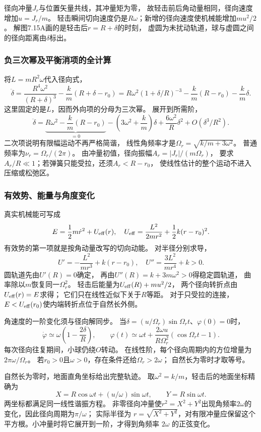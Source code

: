 \documentclass[UTF8,fontset=fandol,a4paper,11pt]{ctexart}
\begin{document}
径向冲量$J_r$与位置矢量共线，其冲量矩为零，
故轻击前后角动量相同，径向速度增加$u=J_r/m$。
轻击瞬间切向速度仍是$R\omega$；新增的径向速度使机械能增加$mu^2/2$。
解图7.15A画的是轻击后$r=R+\delta$的时刻，
虚圆为未扰动轨道，球与虚圆之间的径向距离由$\delta$标出。

\subsubsection*{负三次幂及平衡消项的全计算}
将$L=mR^2\omega$代入径向式，
\[
\ddot\delta=\frac{R^4\omega^2}{(R+\delta)^3}
-\frac{k}{m}(R+\delta-r_0)
=R\omega^2(1+\delta/R)^{-3}
-\frac{k}{m}(R-r_0)-\frac{k}{m}\delta.
\]
这里固定的是$L$，因而外向项的分母为三次幂。
展开到所需阶，
\[
\ddot\delta=
\underbrace{R\omega^2-\frac{k}{m}(R-r_0)}_{=0}
-\left(3\omega^2+\frac{k}{m}\right)\delta
+\frac{6\omega^2}{R}\delta^2+O(\delta^3/R^2).
\]
二次项说明有限幅运动不再严格简谐，
线性角频率才是$\Omega_r=\sqrt{k/m+3\omega^2}$。
普通频率为$\nu_r=\Omega_r/(2\pi)$。
由冲量初值，径向振幅$A_r=|J_r|/(m\Omega_r)$，
要求$A_r/R\ll1$；若弹簧只能受拉，还须$A_r<R-r_0$，
使线性估计的整个运动不进入压缩或松弛区。

\subsubsection*{有效势、能量与角度变化}
真实机械能可写成
\[
E=\frac12m\dot r^2+U_{\rm eff}(r),\quad
U_{\rm eff}=\frac{L^2}{2mr^2}+\frac12k(r-r_0)^2.
\]
有效势的第一项就是按角动量改写的切向动能。
对半径分别求导，
\[
U'=-\frac{L^2}{mr^3}+k(r-r_0),\quad
U''=\frac{3L^2}{mr^4}+k>0.
\]
圆轨道先由$U'(R)=0$确定，
再由$U''(R)=k+3m\omega^2>0$得稳定圆轨道，
曲率除以$m$恢复同一$\Omega_r^2$。
轻击后能量为$U_{\rm eff}(R)+mu^2/2$，
两个径向转折点由$U_{\rm eff}(r)=E$求得；
它们只在线性近似下关于$R$等距。
对于只受拉的连接，$E<U_{\rm eff}(r_0)$使内端转折点位于自然长外侧。

角速度的一阶变化须与径向解同步。
当$\delta=(u/\Omega_r)\sin\Omega_rt$、$\varphi(0)=0$时，
\[
\dot\varphi\simeq\omega\left(1-\frac{2\delta}{R}\right),\qquad
\varphi(t)\simeq\omega t+
\frac{2\omega u}{R\Omega_r^2}(\cos\Omega_rt-1).
\]
每次径向往复期间，小球仍绕$O$转动。
在线性阶，每个径向周期内的方位增量为
$2\pi\omega/\Omega_r$。
若$r_0>0$且$\omega>0$，存在条件还给$\Omega_r>2\omega$；
自然长为零时才取等号。

自然长为零时，地面直角坐标给出完整轨迹。
取$\omega^2=k/m$，轻击后的地面坐标精确为
\[
X=R\cos\omega t+(u/\omega)\sin\omega t,\qquad
Y=R\sin\omega t.
\]
两坐标都满足同一线性谐振方程。
非零径向冲量使$r^2=X^2+Y^2$出现角频率$2\omega$的变化，因此径向周期为$\pi/\omega$；
实际半径为 $r=\sqrt{X^2+Y^2}$，对有限冲量应保留这个平方根。小冲量时将它展开到一阶，才得到角频率 $2\omega$ 的正弦变化。
\end{document}
